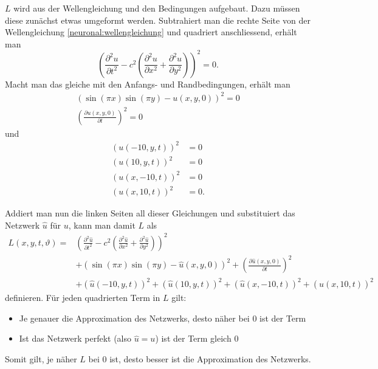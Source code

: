 \( L \) wird aus der Wellengleichung und den Bedingungen aufgebaut. Dazu müssen diese zunächst etwas umgeformt werden.
Subtrahiert man die rechte Seite von der Wellengleichung \eqref{neuronal:wellengleichung} und quadriert anschliessend, erhält man
\begin{equation}
    \left(\frac{\partial^2 u}{\partial t^2} - c^2 \left( \frac{\partial^2 u}{\partial x^2} + \frac{\partial^2 u}{\partial y^2} \right)\right)^2 = 0.
    \label{neuronal:wellengleichung_umformuliert}
\end{equation}
Macht man das gleiche mit den Anfangs- und Randbedingungen, erhält man
\begin{equation}
    \begin{aligned}
        \left(\sin(\pi x) \sin(\pi y) - u(x, y, 0)\right)^2 = 0\\
        \left(\frac{\partial u(x, y, 0)}{\partial t}\right)^2 = 0
    \end{aligned}
    \label{neuronal:wellen_anfangsbedingung_umformuliert}
\end{equation}
und
\begin{equation}
    \begin{aligned}
        \left(u(-10, y, t)\right)^2 &= 0\\
        \left(u(10, y, t)\right)^2 &= 0\\
        \left(u(x, -10, t)\right)^2 &= 0\\
        \left(u(x, 10, t)\right)^2 &= 0.
    \end{aligned}
    \label{neuronal:wellen_randbedingung_umformuliert}
\end{equation}

Addiert man nun die linken Seiten all dieser Gleichungen und substituiert das Netzwerk \( \hat{u} \) für \( u \), kann man damit \( L \) als
\begin{equation}
    \begin{aligned}
        L(x, y, t, \vartheta) = &\left(\frac{\partial^2 \hat{u}}{\partial t^2} - c^2 \left( \frac{\partial^2 \hat{u}}{\partial x^2} + \frac{\partial^2 \hat{u}}{\partial y^2} \right)\right)^2\\
        &+ \left(\sin(\pi x) \sin(\pi y) - \hat{u}(x, y, 0)\right)^2
        + \left(\frac{\partial \hat{u}(x, y, 0)}{\partial t}\right)^2\\
        &+ \left(\hat{u}(-10, y, t)\right)^2
        + \left(\hat{u}(10, y, t)\right)^2
        + \left(\hat{u}(x, -10, t)\right)^2
        + \left(\hat{u}(x, 10, t)\right)^2
    \end{aligned}
    \label{neuronal:optimierung}
\end{equation}
definieren.
Für jeden quadrierten Term in \( L \) gilt:
\begin{itemize}
    \item Je genauer die Approximation des Netzwerks, desto näher bei 0 ist der Term
    \item Ist das Netzwerk perfekt (also \( \hat{u} = u \)) ist der Term gleich 0
\end{itemize}
Somit gilt, je näher \( L \) bei 0 ist, desto besser ist die Approximation des Netzwerks.


